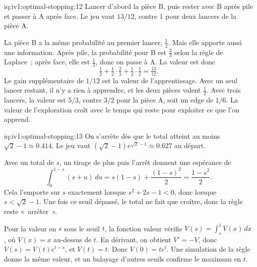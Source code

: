 \begin{solution}{iq:iv1:optimal-stopping:12}
Lancer d'abord la pièce B, puis rester avec B après pile et passer à A après face. Le jeu vaut $13/12$, contre 1 pour deux lancers de la pièce A.

La pièce B a la même probabilité au premier lancer, $\tfrac12$. Mais elle apporte aussi une information. Après pile, la probabilité pour B est $\tfrac23$ selon la règle de Laplace~; après face, elle est $\tfrac13$, donc on passe à A. La valeur est donc
\[
\tfrac12 + \tfrac12 \cdot \tfrac23 + \tfrac12 \cdot \tfrac12 = \tfrac{13}{12}.
\]
Le gain supplémentaire de $1/12$ est la valeur de l'apprentissage. Avec un seul lancer restant, il n'y a rien à apprendre, et les deux pièces valent $\tfrac12$. Avec trois lancers, la valeur est $5/3$, contre $3/2$ pour la pièce A, soit un edge de $1/6$. La valeur de l'exploration croît avec le temps qui reste pour exploiter ce que l'on apprend.

\end{solution}

\begin{solution}{iq:iv1:optimal-stopping:13}
On s'arrête dès que le total atteint au moins $\sqrt{2} - 1 \approx 0.414$. Le jeu vaut $(\sqrt{2} - 1)e^{\sqrt{2} - 1} \approx 0.627$ au départ.

Avec un total de $s$, un tirage de plus puis l'arrêt donnent une espérance de
\[
\int_0^{1 - s} (s + u)\,du = s(1 - s) + \frac{(1 - s)^2}{2} = \frac{1 - s^2}{2}.
\]
Cela l'emporte sur $s$ exactement lorsque $s^2 + 2s - 1 < 0$, donc lorsque $s < \sqrt{2} - 1$. Une fois ce seuil dépassé, le total ne fait que croître, donc la règle reste «~arrêter~».

Pour la valeur en $s$ sous le seuil $t$, la fonction valeur vérifie $V(s) = \int_s^1 V(x)\,dx$, où $V(x) = x$ au-dessus de $t$. En dérivant, on obtient $V' = -V$, donc $V(s) = V(t)e^{t - s}$, et $V(t) = t$. Donc $V(0) = te^t$. Une simulation de la règle donne la même valeur, et un balayage d'autres seuils confirme le maximum en $t$.

\end{solution}

